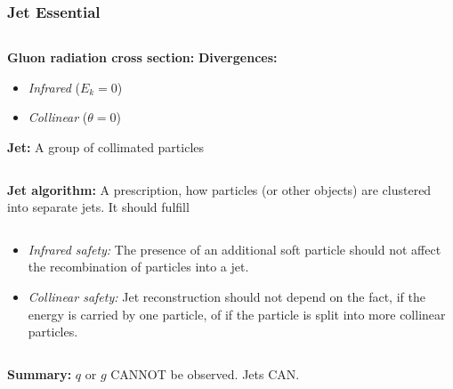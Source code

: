 \documentclass[compress]{beamer}
\begin{document}
\begin{frame}
\frametitle{Jet Essential}
\begin{columns}[onlytextwidth]
  \begin{column}{0.5\textwidth}
    \textbf{Gluon radiation cross section:}
    \textbf{Divergences:}
    \begin{itemize}
      \item \textit{\color{red}Infrared} ($E_k = 0$)
      \item \textit{\color{red}Collinear} ($\theta = 0$)
    \end{itemize}
    \textbf{Jet:} A group of collimated particles
  \end{column}
  \begin{column}{0.5\textwidth}
    \begin{equation*}
      \sigma_{q \rightarrow qg} \sim \frac{d\theta}{|\sin\theta|}
      \frac{dE_k}{E_k}
    \end{equation*}
    \begin{figure}[b]
      \centering
      \texttt{[image: \{../PrezentationATLASmeeting/gluonRadiation]}.png}
    \end{figure}
  \end{column}
\end{columns}
\textbf{Jet algorithm:} A prescription, how particles (or other objects) are clustered
  into separate jets. It should fulfill
\begin{columns}[onlytextwidth]
  \begin{column}{0.7\textwidth}
      \begin{itemize}
        \item \textit{Infrared safety:} The presence of an additional soft particle
          should not affect the recombination of particles into a jet.
        \item \textit{Collinear safety:} Jet reconstruction should not depend on the
          fact, if the energy is carried by one particle, of if the particle is
          split into more collinear particles.
      \end{itemize}
  \end{column}
  \begin{column}{0.3\textwidth}
    \begin{figure}[b]
      \centering
      \texttt{[image: \{../PrezentationATLASmeeting/clustering]}.png}
    \end{figure}
  \end{column}
\end{columns}
\textbf{Summary:} $q$ or $g$ {\color{red}CANNOT} be observed. Jets
{\color{red}CAN}.

\end{frame}
\end{document}
